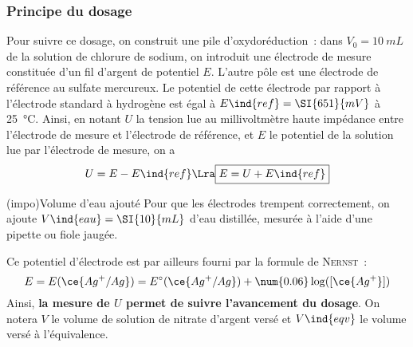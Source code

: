 \documentclass[../main/main.tex]{subfiles}
\begin{document}
{\subsubsection{Principe du dosage}
Pour suivre ce dosage, on construit une pile d'oxydoréduction~: dans $V_0 =
	\SI{10}{mL}$ de la solution de chlorure de sodium, on introduit une électrode
de mesure constituée d'un fil d'argent de potentiel $E$. L'autre pôle est une
électrode de référence au sulfate mercureux. Le potentiel de cette électrode
par rapport à l'électrode standard à hydrogène est égal à $E\ind{ref} =
	\SI{651}{mV}$ à \SI{25}{\degreeCelsius}. Ainsi, en notant $U$ la tension lue
au millivoltmètre haute impédance entre l'électrode de mesure et l'électrode
de référence, et $E$ le potentiel de la solution lue par l'électrode de
mesure, on a
\[
	U = E - E\ind{ref}
	\Lra
	\boxed{E = U + E\ind{ref}}
\]
\begin{tcb}(impo){Volume d'eau ajouté}
	Pour que les électrodes trempent correctement, on ajoute $V\ind{eau} =
		\SI{10}{mL}$ d'eau distillée, mesurée à l'aide d'une pipette ou fiole
	jaugée.
\end{tcb}
Ce potentiel d'électrode est par ailleurs fourni par la formule de
\textsc{Nernst}~:
\[
	E = E(\ce{Ag^+/Ag}) = E^\circ (\ce{Ag^+/Ag}) + \num{0.06} \log ([\ce{Ag^+}])
\]
Ainsi, \textbf{la mesure de $U$ permet de suivre l'avancement du dosage}. On
notera $V$ le volume de solution de nitrate d'argent versé et $V\ind{eqv}$ le
volume versé à l'équivalence.

}
\end{document}
